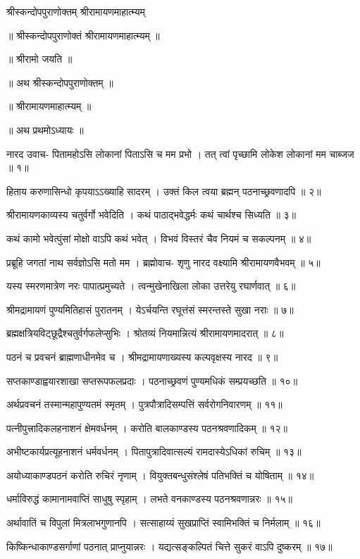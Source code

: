  श्रीस्कन्दोपपुराणोक्तम् श्रीरामायणमाहात्म्यम् 


॥ श्रीस्कन्दोपपुराणोक्तं श्रीरामायणमाहात्म्यम् ॥

॥ श्रीरामो जयति ॥

॥ अथ श्रीस्कन्दोपपुराणोक्तम् ॥

॥ श्रीरामायणमाहात्म्यम् ॥

॥ अथ प्रथमोऽध्यायः ॥

नारद उवाच-
पितामहोऽसि लोकानां पिताऽसि च मम प्रभो ।
तत् त्वां पृच्छामि लोकेश लोकानां मम चाब्जज ॥ १॥

हिताय करुणासिन्धो कृपयाऽऽख्याहि सादरम् ।
उक्तं किल त्वया ब्रह्मन् पठनाच्छ्रवणादपि ॥ २॥

श्रीरामायणकाव्यस्य चतुर्वर्गो भवेदिति ।
कथं पाठाद्भवेद्धर्मः कथं चार्थश्च सिध्यति ॥ ३॥

कथं कामो भवेत्पुंसां मोक्षो वाऽपि कथं भवेत् ।
विभवं विस्तरं चैव नियमं च सकल्पनम् ॥ ४॥

प्रब्रूहि जगतां नाथ सर्वज्ञोऽसि मतो मम ।
ब्रह्मोवाच-
श‍ृणु नारद वक्ष्यामि श्रीरामायणवैभवम् ॥ ५॥

यस्य स्मरणमात्रेण नरः पापात्प्रमुच्यते ।
त्वन्मुखेनाखिला लोका उत्तरेयु रघार्णवात् ॥ ६॥

श्रीमद्रामायणं पुण्यमितिहासं पुरातनम् ।
येऽर्चयन्ति रघूत्तंसं स्मरन्तस्ते सुखा नराः ॥ ७॥

ब्रह्मक्षत्रियविट्छूद्रैश्चतुर्वर्गफलेप्सुभिः ।
श्रोतव्यं नियमान्नित्यं श्रीरामायणमादरात् ॥ ८॥

पठनं च प्रवचनं ब्राह्मणाधीनमेव च ।
श्रीमद्रामायणाख्यस्य कल्पवृक्षस्य नारद ॥ ९॥

सप्तकाण्डाह्वयारशाखा सप्तरूपफलप्रदाः ।
पठनाच्छ्रवणं पुण्यमधिकं सम्प्रयच्छति ॥ १०॥

अर्थप्रवचनं तस्मान्महापुण्यतमं स्मृतम् ।
पुत्रपौत्रादिसम्पत्तिं सर्वरोगनिवारणम् ॥ ११॥

पत्नीपुत्त्रादिकलहनाशनं क्षेमवर्धनम् ।
करोति बालकाण्डस्य पठनश्रवणादिकम् ॥ १२॥

अभीष्टकार्यप्रत्यूहनाशनं धर्मवर्धनम् ।
पितापुत्रादिवात्सल्यं रामदास्येऽधिकां रुचिम् ॥ १३॥

अयोध्याकाण्डपठनं करोति रुचिरं नृणाम् ।
वियुक्तबन्धुसंश्लेषं पतिभक्तिं च योषिताम् ॥ १४॥

धर्माविरुद्धं कामानामवाप्तिं साधुषु स्पृहाम् ।
लभते वनकाण्डस्य पठनश्रवणान्नरः ॥ १५॥

अर्थावातिं च विपुलां मित्रलाभगुणानपि ।
सत्साहाय्यं सुखप्राप्तिं स्वामिभक्तिं च निर्मलाम् ॥ १६॥

किष्किन्धाकाण्डसर्गाणां पठनात् प्राप्नुयान्नरः ।
यद्यत्सङ्कल्पितं चित्ते सुकरं वाऽपि दुष्करम् ॥ १७॥

